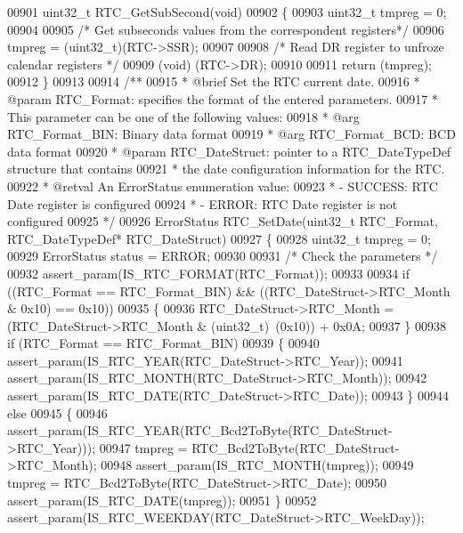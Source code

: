 \begin{DoxyCode}
00901 uint32\_t RTC_GetSubSecond(\textcolor{keywordtype}{void})
00902 \{
00903   uint32\_t tmpreg = 0;
00904 
00905   \textcolor{comment}{/* Get subseconds values from the correspondent registers*/}
00906   tmpreg = (uint32\_t)(RTC->SSR);
00907 
00908   \textcolor{comment}{/* Read DR register to unfroze calendar registers */}
00909   (\textcolor{keywordtype}{void}) (RTC->DR);
00910 
00911   \textcolor{keywordflow}{return} (tmpreg);
00912 \}
00913 
00914 \textcolor{comment}{/**}
00915 \textcolor{comment}{  * @brief  Set the RTC current date.}
00916 \textcolor{comment}{  * @param  RTC\_Format: specifies the format of the entered parameters.}
00917 \textcolor{comment}{  *          This parameter can be  one of the following values:}
00918 \textcolor{comment}{  *            @arg RTC\_Format\_BIN:  Binary data format }
00919 \textcolor{comment}{  *            @arg RTC\_Format\_BCD:  BCD data format}
00920 \textcolor{comment}{  * @param  RTC\_DateStruct: pointer to a RTC\_DateTypeDef structure that contains }
00921 \textcolor{comment}{  *                         the date configuration information for the RTC.}
00922 \textcolor{comment}{  * @retval An ErrorStatus enumeration value:}
00923 \textcolor{comment}{  *          - SUCCESS: RTC Date register is configured}
00924 \textcolor{comment}{  *          - ERROR: RTC Date register is not configured}
00925 \textcolor{comment}{  */}
00926 ErrorStatus RTC_SetDate(uint32\_t RTC\_Format, RTC\_DateTypeDef* RTC\_DateStruct)
00927 \{
00928   uint32\_t tmpreg = 0;
00929   ErrorStatus status = ERROR;
00930 
00931   \textcolor{comment}{/* Check the parameters */}
00932   assert_param(IS\_RTC\_FORMAT(RTC\_Format));
00933 
00934   \textcolor{keywordflow}{if} ((RTC\_Format == RTC_Format_BIN) && ((RTC\_DateStruct->RTC_Month & 0x10) == 0x10))
00935   \{
00936     RTC\_DateStruct->RTC_Month = (RTC\_DateStruct->RTC_Month & (uint32\_t)~(0x10)) + 0x0A;
00937   \}
00938   \textcolor{keywordflow}{if} (RTC\_Format == RTC_Format_BIN)
00939   \{
00940     assert_param(IS\_RTC\_YEAR(RTC\_DateStruct->RTC\_Year));
00941     assert_param(IS\_RTC\_MONTH(RTC\_DateStruct->RTC\_Month));
00942     assert_param(IS\_RTC\_DATE(RTC\_DateStruct->RTC\_Date));
00943   \}
00944   \textcolor{keywordflow}{else}
00945   \{
00946     assert_param(IS\_RTC\_YEAR(RTC\_Bcd2ToByte(RTC\_DateStruct->RTC\_Year)));
00947     tmpreg = RTC_Bcd2ToByte(RTC\_DateStruct->RTC_Month);
00948     assert_param(IS\_RTC\_MONTH(tmpreg));
00949     tmpreg = RTC_Bcd2ToByte(RTC\_DateStruct->RTC_Date);
00950     assert_param(IS\_RTC\_DATE(tmpreg));
00951   \}
00952   assert_param(IS\_RTC\_WEEKDAY(RTC\_DateStruct->RTC\_WeekDay));

\end{DoxyCode}
